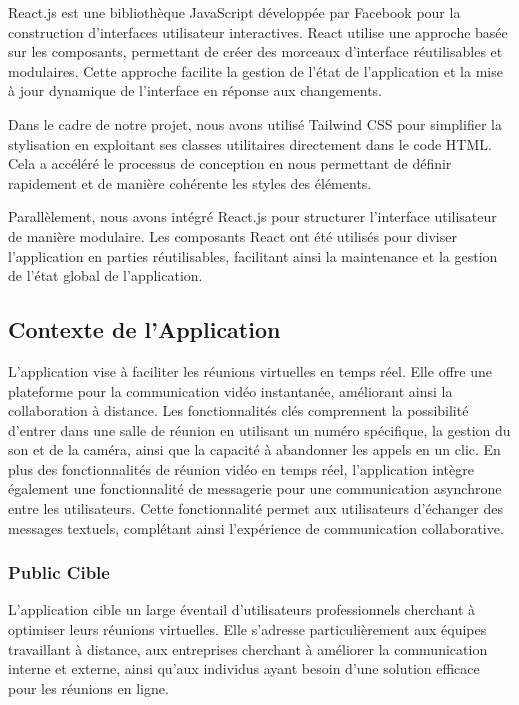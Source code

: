 \documentclass[12pt, a4paper, oneside]{thesis}
\begin{document}
React.js est une bibliothèque JavaScript développée par Facebook pour la construction d'interfaces utilisateur interactives. React utilise une approche basée sur les composants, permettant de créer des morceaux d'interface réutilisables et modulaires. Cette approche facilite la gestion de l'état de l'application et la mise à jour dynamique de l'interface en réponse aux changements.

Dans le cadre de notre projet, nous avons utilisé Tailwind CSS pour simplifier la stylisation en exploitant ses classes utilitaires directement dans le code HTML. Cela a accéléré le processus de conception en nous permettant de définir rapidement et de manière cohérente les styles des éléments.

Parallèlement, nous avons intégré React.js pour structurer l'interface utilisateur de manière modulaire. Les composants React ont été utilisés pour diviser l'application en parties réutilisables, facilitant ainsi la maintenance et la gestion de l'état global de l'application.

\subsection{Contexte de l'Application}
L'application vise à faciliter les réunions virtuelles en temps réel. Elle offre une plateforme pour la communication vidéo instantanée, améliorant ainsi la collaboration à distance. Les fonctionnalités clés comprennent la possibilité d'entrer dans une salle de réunion en utilisant un numéro spécifique, la gestion du son et de la caméra, ainsi que la capacité à abandonner les appels en un clic.
En plus des fonctionnalités de réunion vidéo en temps réel, l'application intègre également une fonctionnalité de messagerie pour une communication asynchrone entre les utilisateurs. Cette fonctionnalité permet aux utilisateurs d'échanger des messages textuels, complétant ainsi l'expérience de communication collaborative.

\subsubsection{Public Cible}
L'application cible un large éventail d'utilisateurs professionnels cherchant à optimiser leurs réunions virtuelles. Elle s'adresse particulièrement aux équipes travaillant à distance, aux entreprises cherchant à améliorer la communication interne et externe, ainsi qu'aux individus ayant besoin d'une solution efficace pour les réunions en ligne.
\end{document}
